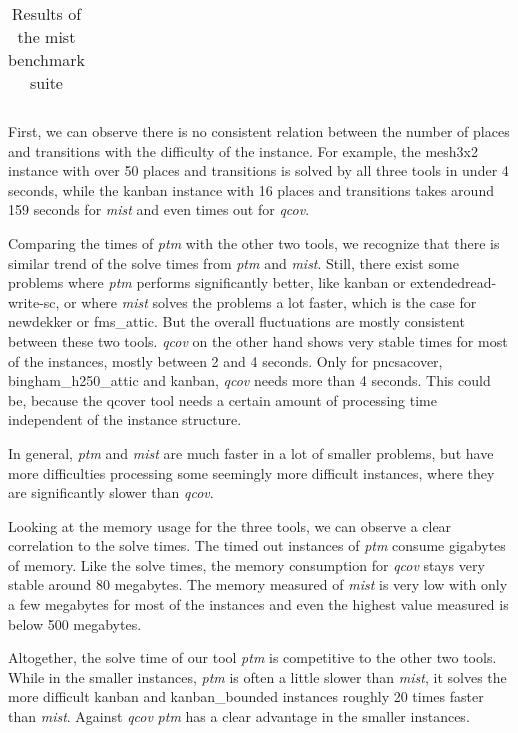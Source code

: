 \begin{table}[H]
{\begin{tabular}{c c c c c c c c c c}
\bottomrule
\end{tabular}%
}
\caption{Results of the mist benchmark suite}
\label{tab:mist-results}
\end{table}


First, we can observe there is no consistent relation between the number of places and transitions with the difficulty of the instance. For example, the mesh3x2 instance with over 50 places and transitions is solved by all three tools in under 4 seconds, while the kanban instance with 16 places and transitions takes around 159 seconds for \textit{mist} and even times out for \textit{qcov}.

Comparing the times of \textit{ptm} with the other two tools, we recognize that there is similar trend of the solve times from \textit{ptm} and \textit{mist}. Still, there exist some problems where \textit{ptm} performs significantly better, like kanban or extendedread-write-sc, or where \textit{mist} solves the problems a lot faster, which is the case for newdekker or fms\_attic. But the overall fluctuations are mostly consistent between these two tools. 
\textit{qcov} on the other hand shows very stable times for most of the instances, mostly between 2 and 4 seconds. Only for pncsacover, bingham\_h250\_attic and kanban, \textit{qcov} needs more than 4 seconds. This could be, because the qcover tool needs a certain amount of processing time independent of the instance structure.

In general, \textit{ptm} and \textit{mist} are much faster in a lot of smaller problems, but have more difficulties processing some seemingly more difficult instances, where they are significantly slower than \textit{qcov}. 

Looking at the memory usage for the three tools, we can observe a clear correlation to the solve times. The timed out instances of \textit{ptm} consume gigabytes of memory. Like the solve times, the memory consumption for \textit{qcov} stays very stable around 80 megabytes. The memory measured of \textit{mist} is very low with only a few megabytes for most of the instances and even the highest value measured is below 500 megabytes.

Altogether, the solve time of our tool \textit{ptm} is competitive to the other two tools. While in the smaller instances, \textit{ptm} is often a little slower than \textit{mist}, it solves the more difficult kanban and kanban\_bounded instances roughly 20 times faster than \textit{mist}.
Against \textit{qcov} \textit{ptm} has a clear advantage in the smaller instances. 

